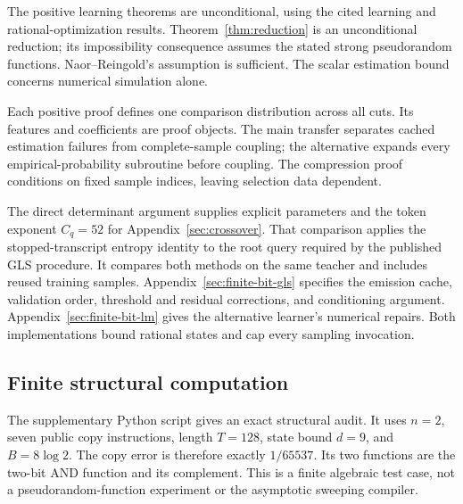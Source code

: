 \documentclass[11pt]{article}
\theoremstyle{definition}
\theoremstyle{remark}
\begin{document}
The positive learning theorems are unconditional, using the cited learning and rational-optimization results. Theorem~\ref{thm:reduction} is an unconditional reduction; its impossibility consequence assumes the stated strong pseudorandom functions. Naor--Reingold's assumption is sufficient. The scalar estimation bound concerns numerical simulation alone.

Each positive proof defines one comparison distribution across all cuts. Its features and coefficients are proof objects. The main transfer separates cached estimation failures from complete-sample coupling; the alternative expands every empirical-probability subroutine before coupling. The compression proof conditions on fixed sample indices, leaving selection data dependent.

The direct determinant argument supplies explicit parameters and the token exponent $C_q=52$ for Appendix~\ref{sec:crossover}. That comparison applies the stopped-transcript entropy identity to the root query required by the published GLS procedure. It compares both methods on the same teacher and includes reused training samples. Appendix~\ref{sec:finite-bit-gls} specifies the emission cache, validation order, threshold and residual corrections, and conditioning argument. Appendix~\ref{sec:finite-bit-lm} gives the alternative learner's numerical repairs. Both implementations bound rational states and cap every sampling invocation.

\subsection{Finite structural computation}

The supplementary Python script gives an exact structural audit. It uses $n=2$, seven public copy instructions, length $T=128$, state bound $d=9$, and $B=8\log2$. The copy error is therefore exactly $1/65537$. Its two functions are the two-bit AND function and its complement. This is a finite algebraic test case, not a pseudorandom-function experiment or the asymptotic sweeping compiler.
\end{document}
